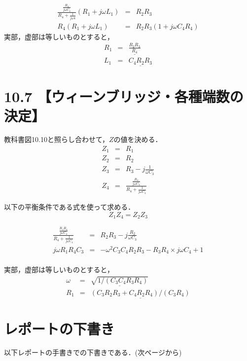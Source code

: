 \documentclass[a4j, titlepage, dvipdfmx]{jarticle}
\begin{document}
\begin{eqnarray}
    \frac{\frac{R_4}{j\omega C_4}}{R_4+ \frac{1}{j\omega 4}}(R_1+j\omega L_1) &=& R_2R_3 \\
    R_4(R_1+j\omega L_1) &=& R_2R_3(1+j\omega C_4R_4)
\end{eqnarray}
実部，虚部は等しいものとすると，
\begin{eqnarray}
    R_1 &=& \underline{\frac{R_2R_3}{R_4}}\\
    L_1 &=& \underline{C_4R_2R_3}
\end{eqnarray}
\newpage

\section*{10.7 【ウィーンブリッジ・各種端数の決定】}
教科書図10.10と照らし合わせて，$Z$の値を決める．
\begin{eqnarray}
    Z_1 &=& R_1\\
    Z_2 &=& R_2 \\
    Z_3 &=& R_3 - j\frac{1}{\omega C_3}  \\
    Z_4 &=& \frac{\frac{R_4}{j\omega C_4}}{R_4 + \frac{1}{j\omega C_4}}
\end{eqnarray}

以下の平衡条件である式を使って求める．
\begin{equation}
    Z_1Z_4 = Z_2Z_3
\end{equation}

\begin{eqnarray}
    \frac{\frac{R_1R_4}{j\omega C_4}}{R_4 + \frac{1}{j\omega C_4}} &=& R_2R_3-j\frac{R_2}{\omega C_3} \\
    j\omega R_1R_4C_3 &=& -\omega^2 C_3 C_4 R_2 R_3 - R_3 R_4 \times j \omega C_4 + 1 \\
\end{eqnarray}

実部，虚部は等しいものとすると，
\begin{eqnarray}
    \omega &=& \underline{\sqrt{1/(C_3 C_4 R_3 R_4)}}\\
    R_1 &=& \underline{(C_3R_2R_3+C_4R_2R_4)/(C_3R_4)}
\end{eqnarray}

\section{レポートの下書き}
以下レポートの手書きでの下書きである．(次ページから)
\end{document}
